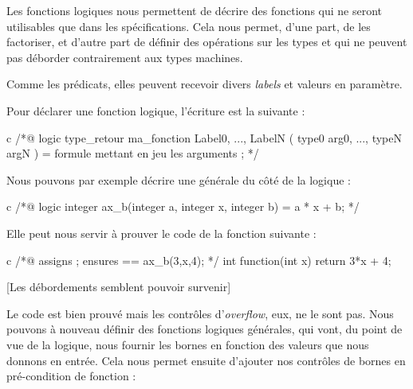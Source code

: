 \documentclass[middle]{zmdocument}
\begin{document}


Les fonctions logiques nous permettent de décrire des fonctions qui ne seront 
utilisables que dans les spécifications. Cela nous permet, d'une part, de les 
factoriser, et d'autre part de définir des opérations sur les types  et 
 qui ne peuvent pas déborder contrairement aux types machines.



Comme les prédicats, elles peuvent recevoir divers \textit{labels} et valeurs en 
paramètre.





Pour déclarer une fonction logique, l'écriture est la suivante :



\begin{CodeBlock}{c}
/*@
  logic type_retour ma_fonction{ Label0, ..., LabelN }( type0 arg0, ..., typeN argN ) =
    formule mettant en jeu les arguments ;
*/
\end{CodeBlock}



Nous pouvons par exemple décrire une  générale du côté de la logique :



\begin{CodeBlock}{c}
/*@
  logic integer ax_b(integer a, integer x, integer b) =
    a * x + b;
*/
\end{CodeBlock}



Elle peut nous servir à prouver le code de la fonction suivante :



\begin{CodeBlock}{c}
/*@ 
  assigns \nothing ;
  ensures \result == ax_b(3,x,4); 
*/
int function(int x){
  return 3*x + 4;
}
\end{CodeBlock}



[Les débordements semblent pouvoir survenir]


Le code est bien prouvé mais les contrôles d'\textit{overflow}, eux, ne le sont pas. Nous 
pouvons à nouveau définir des fonctions logiques générales, qui vont, du point de 
vue de la logique, nous fournir les bornes en fonction des valeurs que nous donnons
en entrée. Cela nous permet ensuite d'ajouter nos contrôles de bornes en 
pré-condition de fonction :
\end{document}
